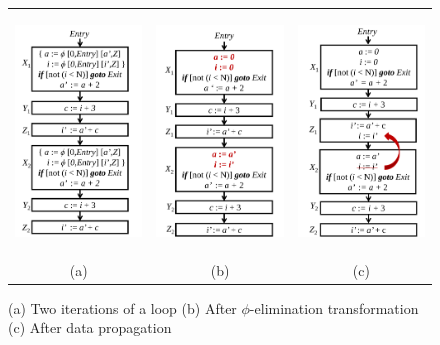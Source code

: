 \begin{enumerate}
\begin{figure}
\begin{center}
\begin{tabular}{ccc}
\includegraphics[height=2.5in]{fig-rpe/algorithm-two-iterations}
& 
\includegraphics[height=2.5in]{fig-rpe/algorithm-after-phi-elimination}
& 
\includegraphics[height=2.5in]{fig-rpe/algorithm-after-data-propagation}
\\
(a) & (b) & (c)
\end{tabular}
\end{center}
\caption{(a) Two iterations of a loop (b) After $\phi$-elimination transformation (c) After data propagation}
\label{fig:algo1}
\end{figure}


\end{enumerate}
